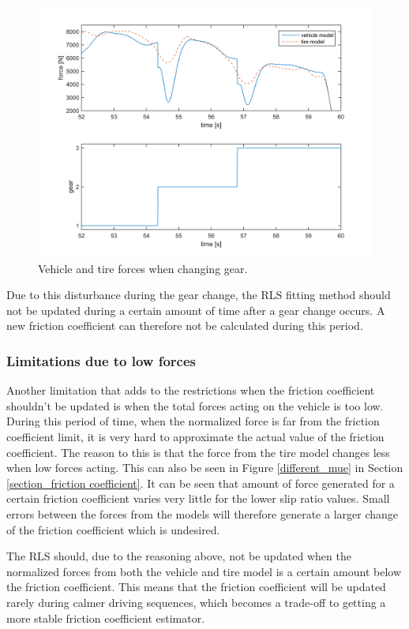 \begin{figure}[h]
	\centering
	\includegraphics[width=1.0\textwidth]{Pictures/gear_change}
	\caption {Vehicle and tire forces when changing gear.}
	\label{gear_change}
\end{figure}

Due to this disturbance during the gear change, the RLS fitting method should not be updated during a certain amount of time after a gear change occurs. A new friction coefficient can therefore not be calculated during this period. 

\subsubsection{Limitations due to low forces}
Another limitation that adds to the restrictions when the friction coefficient shouldn't be updated is when the total forces acting on the vehicle is too low. During this period of time, when the normalized force is far from the friction coefficient limit, it is very hard to approximate the actual value of the friction coefficient. The reason to this is that the force from the tire model changes less when low forces acting. This can also be seen in Figure \ref{different_mue} in Section \ref{section_friction coefficient}. It can be seen that amount of force generated for a certain friction coefficient varies very little for the lower slip ratio values. Small errors between the forces from the models will therefore generate a larger change of the friction coefficient which is undesired. 

The RLS should, due to the reasoning above, not be updated when the normalized forces from both the vehicle and tire model is a certain amount below the friction coefficient. This means that the friction coefficient will be updated rarely during calmer driving sequences, which becomes a trade-off to getting a more stable friction coefficient estimator. 


